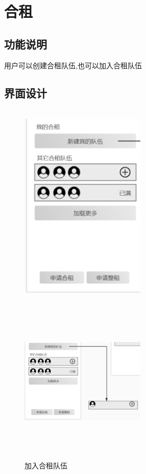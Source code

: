 \section{合租}

\subsection{功能说明}
用户可以创建合租队伍,也可以加入合租队伍
\subsection{界面设计}
\begin{figure}[htbp]
    \centering
    \begin{minipage}[t]{0.48\textwidth}
    \centering
    \includegraphics[width=6cm,height=10cm]{design/image/ui9.png} 
    \caption{}
    \end{minipage}
    \begin{minipage}[t]{0.48\textwidth}
    \centering
    \includegraphics[width=6cm,height=8cm]{design/image/ui6.png}
    \caption{加入合租队伍}
    \end{minipage}
    \end{figure}
\newpage

